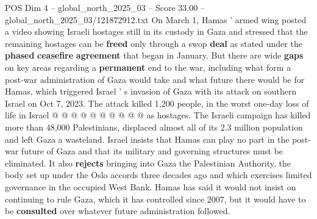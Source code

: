 \begin{textsample}{POS Dim 4 – global\_north\_2025\_03 – Score 33.00 – global\_north\_2025\_03/121872912.txt}
On March 1, Hamas ' armed wing posted a video showing Israeli hostages still in its custody in Gaza and stressed that the remaining hostages can be \textbf{freed} only through a swop \textbf{deal} as stated under the \textbf{phased} \textbf{ceasefire} \textbf{agreement} that began in January.
But there are wide \textbf{gaps} on key areas regarding a \textbf{permanent} end to the war, including what form a post-war administration of Gaza would take and what future there would be for Hamas, which triggered Israel ' s invasion of Gaza with its attack on southern Israel on Oct 7, 2023.
The attack killed 1,200 people, in the worst one-day loss of life in Israel @ @ @ @ @ @ @ @ @ @ as hostages.
The Israeli campaign has killed more than 48,000 Palestinians, displaced almost all of its 2.3 million population and left Gaza a wasteland.
Israel insists that Hamas can play no part in the post-war future of Gaza and that its military and governing structures must be eliminated.
It also \textbf{rejects} bringing into Gaza the Palestinian Authority, the body set up under the Oslo accords three decades ago and which exercises limited governance in the occupied West Bank.
Hamas has said it would not insist on continuing to rule Gaza, which it has controlled since 2007, but it would have to be \textbf{consulted} over whatever future administration followed.

\end{textsample}
